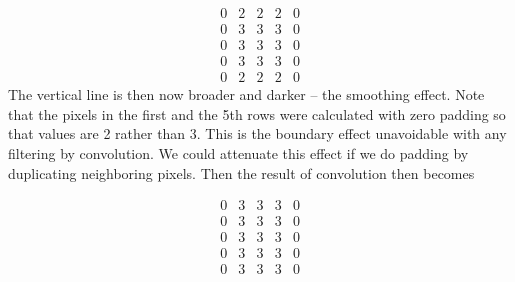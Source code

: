 
\[
 \begin{matrix}
  0 & 2 & 2 & 2 & 0 \\
  0 & 3 & 3 & 3 & 0 \\
  0 & 3 & 3 & 3 & 0 \\
  0 & 3 & 3 & 3 & 0 \\
  0 & 2 & 2 & 2 & 0 
 \end{matrix}
\]
The vertical line is then now broader and darker -- the smoothing
effect. Note that the pixels in the first and the 5th rows were
calculated with zero padding so that values are 2 rather than 3. This
is the boundary effect unavoidable with any filtering by convolution.
We could attenuate this effect if we do padding by duplicating
neighboring pixels. Then the result of convolution then becomes

\[
 \begin{matrix}
  0 & 3 & 3 & 3 & 0 \\
  0 & 3 & 3 & 3 & 0 \\
  0 & 3 & 3 & 3 & 0 \\
  0 & 3 & 3 & 3 & 0 \\
  0 & 3 & 3 & 3 & 0 
 \end{matrix}
\]

